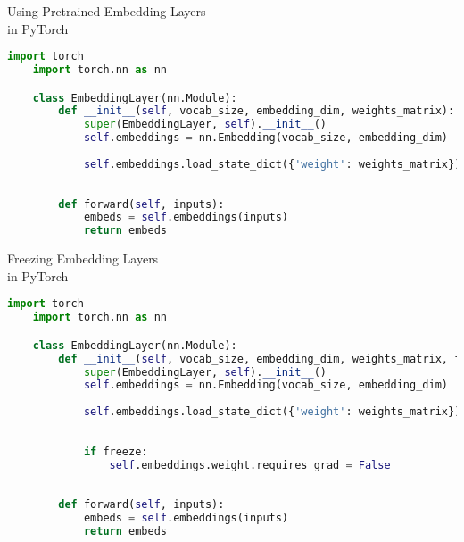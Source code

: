\begin{frame}[fragile]{Using Pretrained Embedding Layers  \\ in PyTorch}
  \tiny
     \begin{lstlisting}[language=Python]
    import torch
    import torch.nn as nn

    class EmbeddingLayer(nn.Module):
        def __init__(self, vocab_size, embedding_dim, weights_matrix):
            super(EmbeddingLayer, self).__init__()
            self.embeddings = nn.Embedding(vocab_size, embedding_dim)
            
            self.embeddings.load_state_dict({'weight': weights_matrix})
        
         
        def forward(self, inputs):
            embeds = self.embeddings(inputs)
            return embeds
    \end{lstlisting}
\end{frame}
 
\begin{frame}[fragile]{Freezing Embedding Layers \\ in PyTorch}
 
  \tiny
     \begin{lstlisting}[language=Python]
    import torch
    import torch.nn as nn

    class EmbeddingLayer(nn.Module):
        def __init__(self, vocab_size, embedding_dim, weights_matrix, freeze=False):
            super(EmbeddingLayer, self).__init__()
            self.embeddings = nn.Embedding(vocab_size, embedding_dim)
            
            self.embeddings.load_state_dict({'weight': weights_matrix})
            
            
            if freeze:
                self.embeddings.weight.requires_grad = False
            
            
        def forward(self, inputs):
            embeds = self.embeddings(inputs)
            return embeds
    \end{lstlisting}
\end{frame}
 
